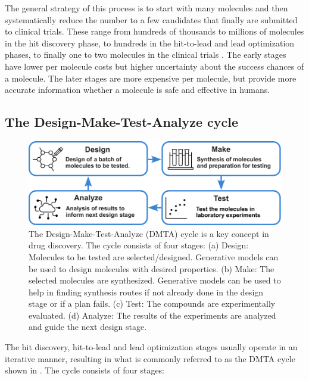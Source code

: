 The general strategy of this process is to start with many molecules and then
systematically reduce the number to a few candidates that finally are submitted to clinical trials.
These range from hundreds of thousands to millions of molecules in the hit discovery phase, to hundreds
in the hit-to-lead and lead optimization phases, to finally one to two molecules in the clinical trials \citep{hughesPrinciplesEarlyDrug2011}.
The early stages have lower per molecule costs but higher uncertainty about the success
chances of a molecule. The later stages are more expensive per molecule, but provide more accurate information
whether a molecule is safe and effective in humans.


\subsection{The Design-Make-Test-Analyze cycle}
\begin{figure}
    \centering
    \includegraphics[width=\textwidth]{figures/dmta_cycle_v2.pdf}
    \caption{The Design-Make-Test-Analyze (DMTA) cycle is a key concept in drug discovery. The
        cycle consists of four stages: (a) Design: Molecules to be tested are selected/designed.
        Generative models can be used to design molecules with desired properties. (b) Make: The
        selected molecules are synthesized. Generative models can be used to help in finding
        synthesis routes if not already done in the design stage or if a plan fails. (c) Test:
        The compounds are experimentally evaluated. (d) Analyze: The results of the experiments
        are analyzed and guide the next design stage. \label{fig:dmta-cycle}}
\end{figure}
The hit discovery, hit-to-lead and lead optimization stages usually operate in an iterative manner,
resulting in what is commonly referred to as the \ac{DMTA} cycle \citep{wesolowskiStrategiesPoliticsSuccessful2016}
shown in . The cycle consists of four stages:
